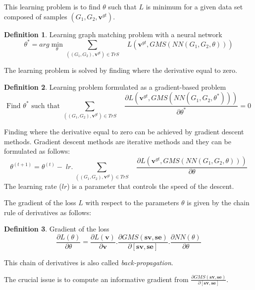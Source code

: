 \documentclass[times,onecolumn,final,authoryear]{article}
\theoremstyle{definition}
\newtheorem{definition}{Definition}
\begin{document}
This learning problem is to find $\theta$ such that $L$ is minimum for a given data set composed of samples $(G_1,G_2,\mathbf{v}^{gt})$. 
\begin{definition}{Learning graph matching problem with a neural network}
\begin{equation}
\theta^* = arg \min_{\theta} \sum_{ ((G_1,G_2),\textbf{v}^{gt}) \in TrS} \quad
 L(\mathbf{v}^{gt},GMS(NN(G_1,G_2,\theta)))
\end{equation}
\end{definition}
The learning problem is solved by finding where the derivative equal to zero.

\begin{definition}{Learning problem formulated as a gradient-based problem}
\begin{equation}
\text{Find } \theta^* \text{ such that } \sum_{ ((G_1,G_2),\textbf{v}^{gt}) \in TrS} \quad \frac{\partial L(\mathbf{v}^{gt},GMS(NN(G_1,G_2,\theta^*)))}{\partial \theta^*} =0
\end{equation}
\end{definition}
Finding where the derivative equal to zero can be achieved by gradient descent methods. Gradient descent methods are iterative methods and they can be formulated as follows: 
$$\theta^{(t+1)}= \theta^{(t)} - \; lr. \, \sum_{ ((G_1,G_2),\textbf{v}^{gt}) \in TrS} \quad
\frac{\partial L(\mathbf{v}^{gt},GMS(NN(G_1,G_2,\theta)))}{\partial \theta} $$
The learning rate ($lr$) is a parameter that controls the speed of the descent.

The gradient of the loss $L$ with respect to the parameters $\theta$ is given by the chain rule of derivatives as follows:
\begin{definition}{Gradient of the loss}
\begin{equation}
\label{eq:gradlossgeneral}
\frac{\partial L(\theta)}{\partial \theta} =  \frac{\partial L(\mathbf{ {v} })}{\partial \mathbf{ {v} } } . \frac{\partial GMS( \mathbf{sv}, \mathbf{se})}{\partial  [\mathbf{sv}, \mathbf{se}] } . \frac{\partial NN(\theta)}{\partial \theta }
\end{equation}
\end{definition}
This chain of derivatives is also called \textit{back-propagation}.

The crucial issue is to compute an informative gradient from $ \frac{\partial GMS( \mathbf{sv}, \mathbf{se})}{\partial  [\mathbf{sv}, \mathbf{se}] }$.
\end{document}

